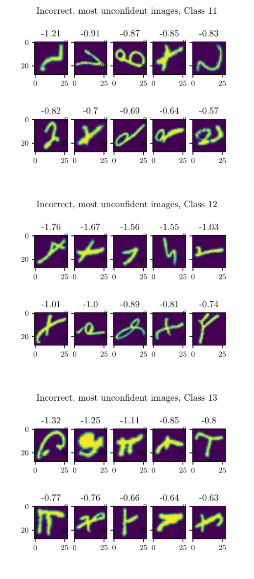 \documentclass[11pt]{article}
\begin{document}
\includegraphics{figures/2d_unconfident_imgs_class_11.pdf}

\includegraphics{figures/2d_unconfident_imgs_class_12.pdf}

\includegraphics{figures/2d_unconfident_imgs_class_13.pdf}
\end{document}
